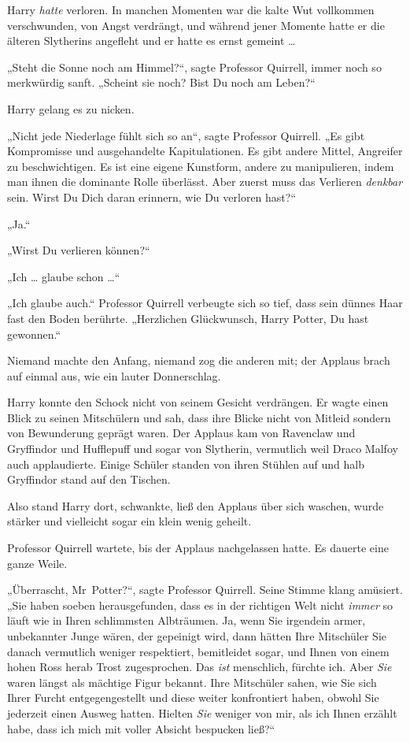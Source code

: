 {Harry \emph{hatte} verloren. In manchen Momenten war die kalte Wut vollkommen verschwunden, von Angst verdrängt, und während jener Momente hatte er die älteren Slytherins angefleht und er hatte es ernst gemeint …

„Steht die Sonne noch am Himmel?“, sagte Professor Quirrell, immer noch so merkwürdig sanft. „Scheint sie noch? Bist Du noch am Leben?“

Harry gelang es zu nicken.

„Nicht jede Niederlage fühlt sich so an“, sagte Professor Quirrell. „Es gibt Kompromisse und ausgehandelte Kapitulationen. Es gibt andere Mittel, Angreifer zu beschwichtigen. Es ist eine eigene Kunstform, andere zu manipulieren, indem man ihnen die dominante Rolle überlässt. Aber zuerst muss das Verlieren \emph{denkbar} sein. Wirst Du Dich daran erinnern, wie Du verloren hast?“

„Ja.“

„Wirst Du verlieren können?“

„Ich … glaube schon …“

„Ich glaube auch.“ Professor Quirrell verbeugte sich so tief, dass sein dünnes Haar fast den Boden berührte. „Herzlichen Glückwunsch, Harry Potter, Du hast gewonnen.“

Niemand machte den Anfang, niemand zog die anderen mit; der Applaus brach auf einmal aus, wie ein lauter Donnerschlag.

Harry konnte den Schock nicht von seinem Gesicht verdrängen. Er wagte einen Blick zu seinen Mitschülern und sah, dass ihre Blicke nicht von Mitleid sondern von Bewunderung geprägt waren. Der Applaus kam von Ravenclaw und Gryffindor und Hufflepuff und sogar von Slytherin, vermutlich weil Draco Malfoy auch applaudierte. Einige Schüler standen von ihren Stühlen auf und halb Gryffindor stand auf den Tischen.

Also stand Harry dort, schwankte, ließ den Applaus über sich waschen, wurde stärker und vielleicht sogar ein klein wenig geheilt.

Professor Quirrell wartete, bis der Applaus nachgelassen hatte. Es dauerte eine ganze Weile.

„Überrascht, Mr~Potter?“, sagte Professor Quirrell. Seine Stimme klang amüsiert. „Sie haben soeben herausgefunden, dass es in der richtigen Welt nicht \emph{immer} so läuft wie in Ihren schlimmsten Albträumen. Ja, wenn Sie irgendein armer, unbekannter Junge wären, der gepeinigt wird, dann hätten Ihre Mitschüler Sie danach vermutlich weniger respektiert, bemitleidet sogar, und Ihnen von einem hohen Ross herab Trost zugesprochen. Das \emph{ist} menschlich, fürchte ich. Aber \emph{Sie} waren längst als mächtige Figur bekannt. Ihre Mitschüler sahen, wie Sie sich Ihrer Furcht entgegengestellt und diese weiter konfrontiert haben, obwohl Sie jederzeit einen Ausweg hatten. Hielten \emph{Sie} weniger von mir, als ich Ihnen erzählt habe, dass ich mich mit voller Absicht bespucken ließ?“

}
